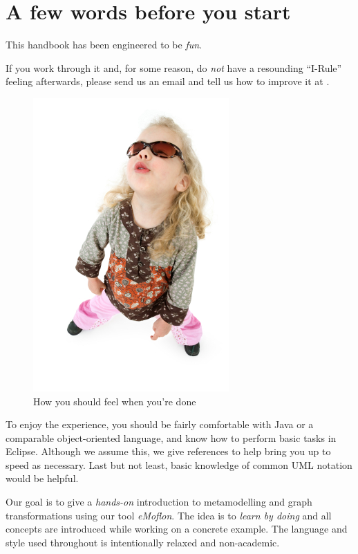 \genHeader
\newpage


\chapter{A few words before you start}

This handbook has been engineered to be \emph{fun}.

If you work through it and, for some reason, do \emph{not} have a resounding \mbox{\enquote{I-Rule}} feeling afterwards, please send us an email and tell us how to improve it at \eMoflonContact.

\begin{figure}[htp]
\begin{center}
	\includegraphics[height=0.45\textheight]{../../org.moflon.doc.handbook.00_introduction/introduction_images/i-rule}
	\caption{How you should feel when you're done}
	\label{i-rule}
\end{center}
\end{figure}
\break
 

To enjoy the experience, you should be fairly comfortable with Java or a comparable object-oriented language, and know how to perform basic tasks in Eclipse. 
Although we assume this, we give references to help bring you up to speed as necessary.
Last but not least, basic knowledge of common UML notation would be helpful.

Our goal is to give a \emph{hands-on} introduction to metamodelling and graph transformations using our tool \emph{eMoflon}.
The idea is to \emph{learn by doing} and all concepts are introduced while working on a concrete example.
The language and style used throughout is intentionally relaxed and non-academic.


